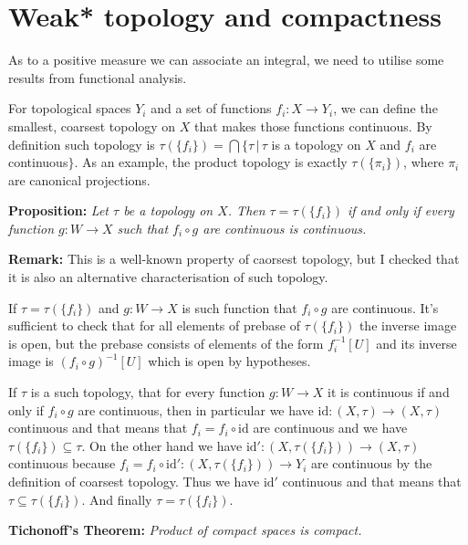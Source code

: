 \documentclass{article}
\begin{document}
\section{Weak* topology and compactness}
As to a positive measure we can associate an integral, we need to utilise some
results from functional analysis.
\vspace{1ex}

For topological spaces $Y_i$ and a set of functions $f_i:X\rightarrow Y_i$, we can
define the smallest, coarsest topology on $X$ that makes those functions continuous.
By definition such topology is $\tau(\{f_i\})=\bigcap\{\tau\,|\,
\tau$ is a topology on $X$ and $f_i$ are continuous$\}$. As an
example, the product topology is exactly $\tau(\{\pi_i\})$, where $\pi_i$ are
canonical projections.
\vspace{1ex}

\textbf{Proposition:} \textit{Let $\tau$ be a topology on $X$. Then $\tau=\tau(\{f_i\})$
if and only if every function $g:W\rightarrow X$ such that $f_i\circ g$ are
continuous is continuous.}
\vspace{1ex}

\textbf{Remark:} This is a well-known property of caorsest topology, but I
checked that it is also an alternative characterisation of such topology.

If $\tau=\tau(\{f_i\})$ and $g:W\rightarrow X$ is such function that $f_i\circ
g$ are continuous. It's sufficient to check that for all elements of prebase
of $\tau(\{f_i\})$ the inverse image is open, but the prebase consists of
elements of the form $f_i^{-1}[U]$ and its inverse image is $(f_i\circ g)^{-1}[U]$
which is open by hypotheses.
\vspace{1ex}

If $\tau$ is a such topology, that for every function $g:W\rightarrow X$ it is
continuous if and only if $f_i\circ g$ are continuous, then in particular we
have $\text{id}:(X,\tau)\rightarrow(X,\tau)$ continuous and that means that $f_i = f_i\circ
\text{id}$ are continuous and we have $\tau(\{f_i\})\subseteq\tau$. On the other
hand we have $\text{id}':(X,\tau(\{f_i\}))\rightarrow(X,\tau)$ continuous
because $f_i = f_i\circ\text{id}':(X,\tau(\{f_i\}))\rightarrow Y_i$ are continuous
by the definition of coarsest topology. Thus we have $\text{id}'$ continuous
and that means that $\tau\subseteq\tau(\{f_i\})$. And finally $\tau=\tau(\{f_i\})$.

\vspace{1ex}

\textbf{Tichonoff's Theorem:} \textit{Product of compact spaces is compact.}
\vspace{1ex}
\end{document}
